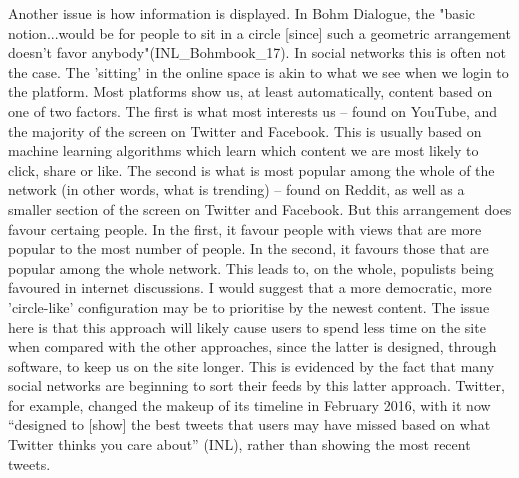 \documentclass[]{article}
\begin{document}
Another issue is how information is displayed. In Bohm Dialogue, the
"basic notion...would be for people to sit in a circle {[}since{]} such
a geometric arrangement doesn't favor anybody"(INL\_Bohmbook\_17). In
social networks this is often not the case. The 'sitting' in the online
space is akin to what we see when we login to the platform. Most
platforms show us, at least automatically, content based on one of two
factors. The first is what most interests us -- found on YouTube, and
the majority of the screen on Twitter and Facebook. This is usually
based on machine learning algorithms which learn which content we are
most likely to click, share or like. The second is what is most popular
among the whole of the network (in other words, what is trending) --
found on Reddit, as well as a smaller section of the screen on Twitter
and Facebook. But this arrangement does favour certaing people. In the
first, it favour people with views that are more popular to the most
number of people. In the second, it favours those that are popular among
the whole network. This leads to, on the whole, populists being favoured
in internet discussions. I would suggest that a more democratic, more
'circle-like' configuration may be to prioritise by the newest content.
The issue here is that this approach will likely cause users to spend
less time on the site when compared with the other approaches, since the
latter is designed, through software, to keep us on the site longer.
This is evidenced by the fact that many social networks are beginning to
sort their feeds by this latter approach. Twitter, for example, changed
the makeup of its timeline in February 2016, with it now ``designed to
{[}show{]} the best tweets that users may have missed based on what
Twitter thinks you care about'' (INL), rather than showing the most
recent tweets.
\end{document}
